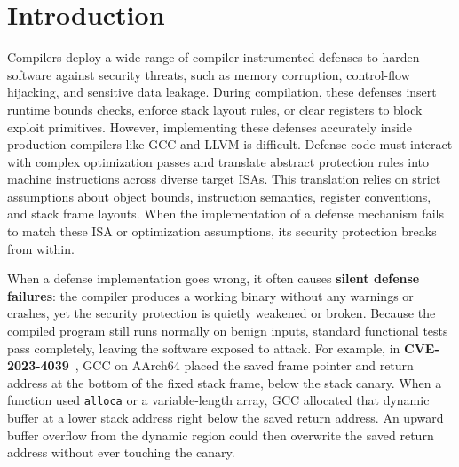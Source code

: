 \documentclass[conference]{IEEEtran}
\begin{document}
\section{Introduction}\label{sec:intro}

Compilers deploy a wide range of compiler-instrumented defenses to harden software against security threats, such as memory corruption, control-flow hijacking, and sensitive data leakage. During compilation, these defenses insert runtime bounds checks, enforce stack layout rules, or clear registers to block exploit primitives. However, implementing these defenses accurately inside production compilers like GCC and LLVM is difficult. Defense code must interact with complex optimization passes and translate abstract protection rules into machine instructions across diverse target ISAs. This translation relies on strict assumptions about object bounds, instruction semantics, register conventions, and stack frame layouts. When the implementation of a defense mechanism fails to match these ISA or optimization assumptions, its security protection breaks from within.

When a defense implementation goes wrong, it often causes \textbf{silent defense failures}: the compiler produces a working binary without any warnings or crashes, yet the security protection is quietly weakened or broken. Because the compiled program still runs normally on benign inputs, standard functional tests pass completely, leaving the software exposed to attack. For example, in \textbf{CVE-2023-4039}~\cite{cve20234039}, GCC on AArch64 placed the saved frame pointer and return address at the bottom of the fixed stack frame, below the stack canary. When a function used \texttt{alloca} or a variable-length array, GCC allocated that dynamic buffer at a lower stack address right below the saved return address. An upward buffer overflow from the dynamic region could then overwrite the saved return address without ever touching the canary.
\end{document}
